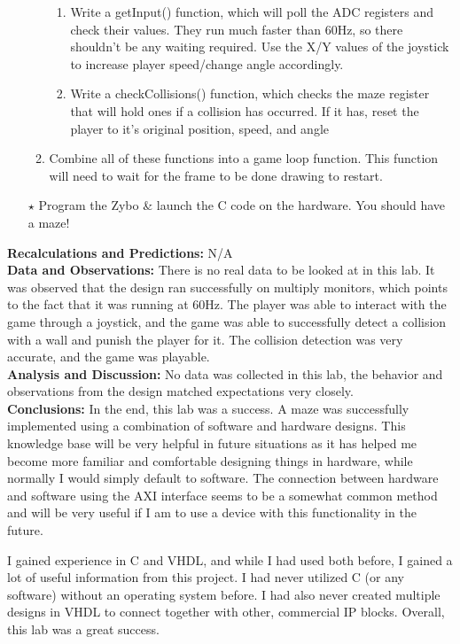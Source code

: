 \documentclass[12pt]{article}
\begin{document}
\begin{itemize}[noitemsep, nolistsep]
\begin{enumerate}
\begin{enumerate}
					\item Write a getInput() function, which will poll the ADC registers and check their values. They run much faster than 60Hz, so there shouldn't be any waiting required. Use the X/Y values of the joystick to increase player speed/change angle accordingly.
					\item Write a checkCollisions() function, which checks the maze register that will hold ones if a collision has occurred. If it has, reset the player to it's original position, speed, and angle
				\end{enumerate}
			\item Combine all of these functions into a game loop function. This function will need to wait for the frame to be done drawing to restart.
		\end{enumerate}
	\item[$\star$] Program the Zybo \& launch the C code on the hardware. You should have a maze!
	\end{itemize}
	
	\noindent \textbf{Recalculations and Predictions:} N/A\\
	
	\noindent \textbf{Data and Observations:} There is no real data to be looked at in this lab. It was observed that the design ran successfully on multiply monitors, which points to the fact that it was running at 60Hz. The player was able to interact with the game through a joystick, and the game was able to successfully detect a collision with a wall and punish the player for it. The collision detection was very accurate, and the game was playable.\\
	
	\noindent \textbf{Analysis and Discussion:} No data was collected in this lab, the behavior and observations from the design matched expectations very closely. \\
	
	\noindent \textbf{Conclusions:} In the end, this lab was a success. A maze was successfully implemented using a combination of software and hardware designs. This knowledge base will be very helpful in future situations as it has helped me become more familiar and comfortable designing things in hardware, while normally I would simply default to software. The connection between hardware and software using the AXI interface seems to be a somewhat common method and will be very useful if I am to use a device with this functionality in the future. 
	
	I gained experience in C and VHDL, and while I had used both before, I gained a lot of useful information from this project. I had never utilized C (or any software) without an operating system before. I had also never created multiple designs in VHDL to connect together with other, commercial IP blocks. Overall, this lab was a great success. 
\end{document}
